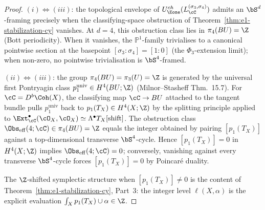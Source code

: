 \begin{proof}
$(i) \Leftrightarrow (iii)$: the topological envelope of
$U^{ch}_{\Eone}(L^{(\sigma_3, \sigma_4)}_\cC)$ admits an $\bS^d$-framing
precisely when the classifying-space obstruction of
Theorem~\ref{thm:e1-stabilization-cy} vanishes. At $d = 4$, this obstruction
class lies in $\pi_4(BU) = \Z$ \textup{(}Bott periodicity\textup{)}. When
it vanishes, the $\mathbb{P}^1$-family trivialises to a canonical
pointwise section at the basepoint $[\sigma_3 : \sigma_4] = [1 : 0]$
\textup{(}the $\Phi_3$-extension limit\textup{)}; when non-zero, no pointwise
trivialisation is $\bS^4$-framed.

$(ii) \Leftrightarrow (iii)$: the group $\pi_4(BU) = \pi_3(U) = \Z$ is
generated by the universal first Pontryagin class
$p_1^{\mathrm{univ}} \in H^4(BU; \Z)$
\textup{(}Milnor--Stasheff Thm.~15.7\textup{)}. For $\cC = D^b\Coh(X)$,
the classifying map $\cC \to BU$ attached to the tangent bundle pulls
$p_1^{\mathrm{univ}}$ back to $p_1(T_X) \in H^4(X; \Z)$ by the splitting
principle applied to $\Ext^\bullet_\cC(\cO_X, \cO_X) \simeq
\Lambda^\bullet T_X[\text{shift}]$. The obstruction class
$\Obs_{\mathrm{eff}}(4; \cC) \in \pi_4(BU) = \Z$ equals the integer obtained
by pairing $[p_1(T_X)]$ against a top-dimensional transverse $\bS^4$-cycle.
Hence $[p_1(T_X)] = 0$ in $H^4(X; \Z)$ implies
$\Obs_{\mathrm{eff}}(4; \cC) = 0$; conversely, vanishing against every
transverse $\bS^4$-cycle forces $[p_1(T_X)] = 0$ by Poincar\'e duality.

The $\Z$-shifted symplectic structure when $[p_1(T_X)] \neq 0$ is the
content of Theorem~\ref{thm:e1-stabilization-cy}, Part~3: the integer
level $\ell(X, \alpha)$ is the explicit evaluation
$\int_X p_1(T_X) \cup \alpha \in \Z$.
\end{proof}

